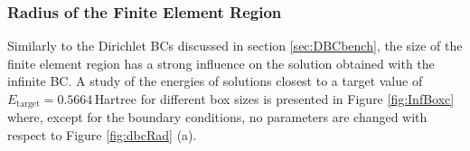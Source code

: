 \subsubsection{Radius of the Finite Element Region}
\label{ch:bmSize}
Similarly to the Dirichlet BCs discussed in section \ref{sec:DBCbench}, the size of the finite element region has a strong influence on the solution obtained with the infinite BC.
A study of the energies of solutions closest to a target value of $E_\text{target}=0.5664\,$Hartree for different box sizes is presented in Figure \ref{fig:InfBoxc} where, except for the boundary conditions, no parameters are changed with respect to Figure \ref{fig:dbcRad} (a).

